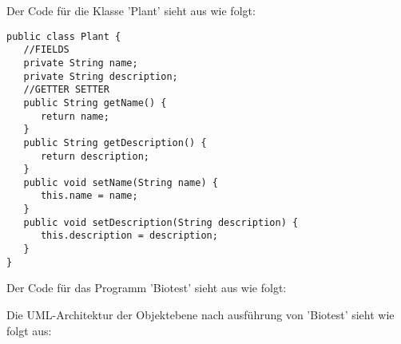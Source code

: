 \documentclass[12pt,a4paper,oneside,ngerman]{article}
\begin{document}
Der Code für die Klasse 'Plant' sieht aus wie folgt:
\begin{lstlisting}
public class Plant {
   //FIELDS
   private String name;
   private String description;
   //GETTER SETTER
   public String getName() {
      return name;
   }
   public String getDescription() {
      return description;
   }
   public void setName(String name) {
      this.name = name;
   }
   public void setDescription(String description) {
      this.description = description;
   }
}
\end{lstlisting}
Der Code für das Programm 'Biotest' sieht aus wie folgt:

Die UML-Architektur der Objektebene nach ausführung von 'Biotest' sieht wie folgt aus:
\end{document}
